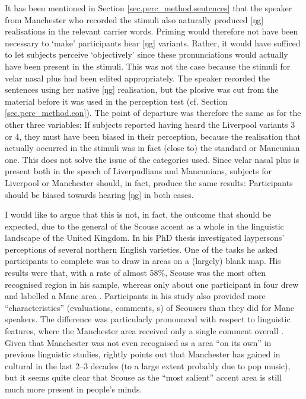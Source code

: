 It has been mentioned in Section \ref{sec.perc_method.sentences} that the speaker from Manchester who recorded the stimuli also naturally produced [ŋg] realisations in the relevant carrier words.
Priming would therefore not have been necessary to `make' participants hear [ŋg] variants.
Rather, it would have sufficed to let subjects perceive `objectively' since these pronunciations would actually have been present in the stimuli.
This was not the case because the stimuli for velar nasal plus had been edited appropriately.
The speaker recorded the sentences using her native [ŋg] realisation, but the plosive was cut from the material before it was used in the perception test (cf. Section \ref{sec.perc_method.con}).
The point of departure was therefore the same as for the other three variables: If subjects reported having heard the Liverpool variants 3 or 4, they must have been biased in their perception, because the realisation that actually occurred in the stimuli was in fact (close to) the standard or Mancunian one.
This does not solve the issue of the  categories used.
Since velar nasal plus is present both in the speech of Liverpudlians and Mancunians,  subjects for Liverpool or Manchester should, in fact, produce the same results: Participants should be biased towards hearing [ŋg] in both cases.

I would like to argue that this is not, in fact, the outcome that should be expected, due to the general  of the Scouse accent as a whole in the linguistic landscape of the United Kingdom.
In his \citeyear{montgomery2007} PhD thesis \citeauthor{montgomery2007} investigated laypersons' perceptions of several northern English varieties.
One of the tasks he asked participants to complete was to draw in  areas on a (largely) blank map.
His results were that, with a rate of almost 58\%, Scouse was the most often recognised  region in his sample, whereas only about one participant in four drew and labelled a Manc area \parencite[cf.][194]{montgomery2007}.
Participants in his study also provided more ``characteristics'' (evaluations, comments, s) of Scousers than they did for Manc speakers.
The difference was particularly pronounced with respect to linguistic features, where the Manchester area received only a single comment overall \parencite[cf.][246--252]{montgomery2007}.
Given that Manchester was not even recognised as a  area ``on its own'' in previous linguistic studies, \textcite[cf.][214--215]{montgomery2007} rightly points out that Manchester has gained in cultural  in the last 2--3 decades (to a large extent probably due to pop music), but it seems quite clear that Scouse as the ``most salient'' \parencite[216]{montgomery2007} accent area is still much more present in people's minds.

